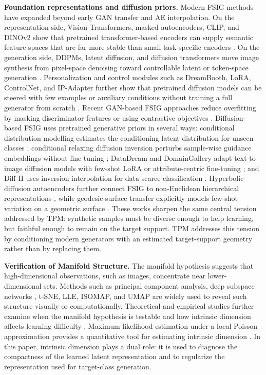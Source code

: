 \documentclass{article}
\begin{document}
\textbf{Foundation representations and diffusion priors.} Modern FSIG methods have expanded beyond early GAN transfer and AE interpolation. On the representation side, Vision Transformers, masked autoencoders, CLIP, and DINOv2 show that pretrained transformer-based encoders can supply semantic feature spaces that are far more stable than small task-specific encoders \citep{dosovitskiy2021image, he2022masked, radford2021learning, oquab2024dinov2}. On the generation side, DDPMs, latent diffusion, and diffusion transformers move image synthesis from pixel-space denoising toward controllable latent or token-space generation \citep{ho2020denoising, rombach2022high, peebles2023scalable}. Personalization and control modules such as DreamBooth, LoRA, ControlNet, and IP-Adapter further show that pretrained diffusion models can be steered with few examples or auxiliary conditions without training a full generator from scratch \citep{ruiz2023dreambooth, hu2022lora, zhang2023adding, ye2023ipadapter}. Recent GAN-based FSIG approaches reduce overfitting by masking discriminator features or using contrastive objectives \citep{zhu2024masked, gou2024few}. Diffusion-based FSIG uses pretrained generative priors in several ways: conditional distribution modelling estimates the conditioning latent distribution for unseen classes \citep{gupta2024conditional}; conditional relaxing diffusion inversion perturbs sample-wise guidance embeddings without fine-tuning \citep{cao2024conditional}; DataDream and DomainGallery adapt text-to-image diffusion models with few-shot LoRA or attribute-centric fine-tuning \citep{kim2024datadream, duan2024domaingallery}; and Diff-II uses inversion interpolation for data-scarce classification \citep{wang2024inversion}. Hyperbolic diffusion autoencoders further connect FSIG to non-Euclidean hierarchical representations \citep{li2025hypdae}, while geodesic-surface transfer explicitly models few-shot variation on a geometric surface \citep{han2026few}. These works sharpen the same central tension addressed by TPM: synthetic samples must be diverse enough to help learning, but faithful enough to remain on the target support. TPM addresses this tension by conditioning modern generators with an estimated target-support geometry rather than by replacing them.

\textbf{Verification of Manifold Structure.} The manifold hypothesis suggests that high-dimensional observations, such as images, concentrate near lower-dimensional sets. Methods such as principal component analysis, deep subspace networks \citep{simon2020adaptive}, t-SNE, LLE, ISOMAP, and UMAP \citep{mcinnes2018umap} are widely used to reveal such structure visually or computationally. Theoretical and empirical studies further examine when the manifold hypothesis is testable and how intrinsic dimension affects learning difficulty \citep{fefferman2016testing, pope2021intrinsic}. Maximum-likelihood estimation under a local Poisson approximation provides a quantitative tool for estimating intrinsic dimension \citep{levina2004maximum}. In this paper, intrinsic dimension plays a dual role: it is used to diagnose the compactness of the learned latent representation and to regularize the representation used for target-class generation.
\end{document}
